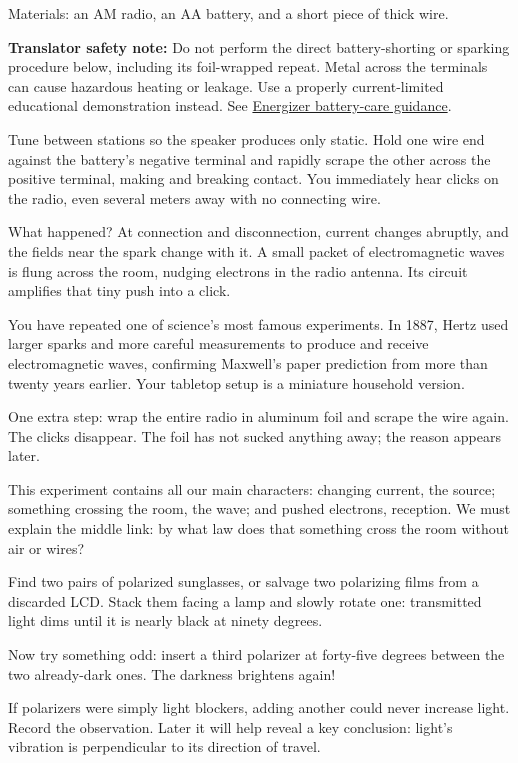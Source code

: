 \begin{experiment}
Materials: an AM radio, an AA battery, and a short piece of thick wire.

\textbf{Translator safety note:} Do not perform the direct battery-shorting or sparking procedure below, including its foil-wrapped repeat. Metal across the terminals can cause hazardous heating or leakage. Use a properly current-limited educational demonstration instead. See \href{https://oem.energizer.com/english/dos-donts/}{Energizer battery-care guidance}.

Tune between stations so the speaker produces only static. Hold one wire end against the battery's negative terminal and rapidly scrape the other across the positive terminal, making and breaking contact. You immediately hear clicks on the radio, even several meters away with no connecting wire.

What happened? At connection and disconnection, current changes abruptly, and the fields near the spark change with it. A small packet of electromagnetic waves is flung across the room, nudging electrons in the radio antenna. Its circuit amplifies that tiny push into a click.

You have repeated one of science's most famous experiments. In 1887, Hertz used larger sparks and more careful measurements to produce and receive electromagnetic waves, confirming Maxwell's paper prediction from more than twenty years earlier. Your tabletop setup is a miniature household version.

One extra step: wrap the entire radio in aluminum foil and scrape the wire again. The clicks disappear. The foil has not sucked anything away; the reason appears later.

This experiment contains all our main characters: changing current, the source; something crossing the room, the wave; and pushed electrons, reception. We must explain the middle link: by what law does that something cross the room without air or wires?
\end{experiment}

\begin{experiment}
Find two pairs of polarized sunglasses, or salvage two polarizing films from a discarded LCD. Stack them facing a lamp and slowly rotate one: transmitted light dims until it is nearly black at ninety degrees.

Now try something odd: insert a third polarizer at forty-five degrees between the two already-dark ones. The darkness brightens again!

If polarizers were simply light blockers, adding another could never increase light. Record the observation. Later it will help reveal a key conclusion: light's vibration is perpendicular to its direction of travel.
\end{experiment}

